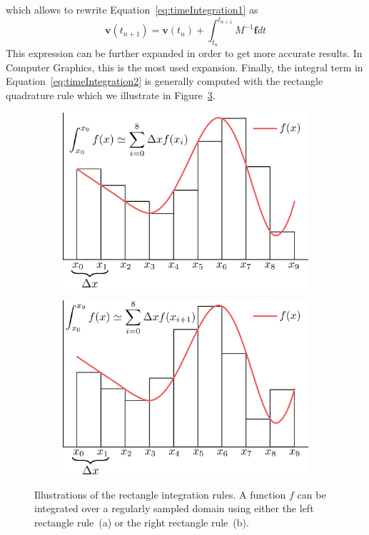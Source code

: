 which allows to rewrite Equation~\eqref{eq:timeIntegration1} as
\begin{equation}
\label{eq:timeIntegration2}
\mathbf{v}(t_{n+1}) = \mathbf{v}(t_{n}) + \int_{t_{n}}^{t_{n+1}} M^{-1}\mathbf{f}dt
\end{equation}
This expression can be further expanded in order to get more accurate results. In Computer Graphics, this is the most used expansion. Finally, the integral term in Equation~\eqref{eq:timeIntegration2} is generally computed with the rectangle quadrature rule which we illustrate in Figure~\ref{fig:rectangleRules}.
\begin{figure}[!ht]
	\centering
	\begin{subfigure}[b]{0.46\linewidth}
		\centering
		\includegraphics[width=\linewidth]{images/continuum_mechanics/rectangleRule_left.png}
		\caption{\label{fig:leftRectangleRule}}
	\end{subfigure}
	\hspace{0.2cm}
	\begin{subfigure}[b]{0.46\linewidth}
		\centering
		\includegraphics[width=\linewidth]{images/continuum_mechanics/rectangleRule_right.png}
		\caption{\label{fig:rightRectangleRule}}
	\end{subfigure}
	\caption[STAR mechanics: Rectangle integration rules]{\label{fig:rectangleRules}
		Illustrations of the rectangle integration rules. A function $f$ can be integrated over a regularly sampled domain using either the left rectangle rule~(a) or the right rectangle rule~(b).}
\end{figure}
